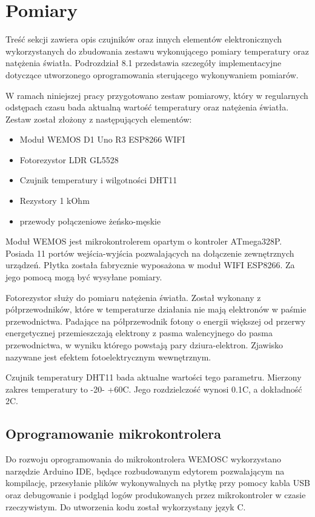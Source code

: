 \newpage
\section{Pomiary}
Treść sekcji zawiera opis czujników oraz innych elementów elektronicznych
wykorzystanych do zbudowania zestawu wykonującego pomiary temperatury
oraz natężenia światła. Podrozdział 8.1 przedstawia szczegóły implementacyjne
dotyczące utworzonego oprogramowania sterującego wykonywaniem pomiarów.

W ramach niniejszej pracy przygotowano zestaw pomiarowy, który 
w regularnych odstępach czasu bada aktualną wartość temperatury oraz
natężenia światła. Zestaw został złożony z następujących elementów:

\begin{itemize} %
    \item Moduł WEMOS D1 Uno R3 ESP8266 WIFI
    \item Fotorezystor LDR GL5528
    \item Czujnik temperatury i wilgotności DHT11
    \item Rezystory 1 kOhm
    \item przewody połączeniowe żeńsko-męskie
\end{itemize}

Moduł WEMOS jest mikrokontrolerem opartym o kontroler ATmega328P. Posiada
11 portów wejścia-wyjścia pozwalających na dołączenie zewnętrznych 
urządzeń. Płytka została fabrycznie wyposażona w moduł WIFI ESP8266. Za
jego pomocą mogą być wysyłane pomiary.

Fotorezystor służy do pomiaru natężenia światła. Został wykonany 
z półprzewodników, które w temperaturze działania nie mają elektronów 
w paśmie przewodnictwa. Padające na półprzewodnik fotony o energii 
większej od przerwy energetycznej przemieszczają elektrony z pasma 
walencyjnego do pasma przewodnictwa, w wyniku którego powstają pary 
dziura-elektron. Zjawisko nazywane jest efektem fotoelektrycznym 
wewnętrznym.

Czujnik temperatury DHT11 bada aktualne wartości tego
parametru. Mierzony zakres temperatury to -20\degree  - +60\degree C.
Jego rozdzielczość wynosi 0.1\degree C, a dokładność 2\degree C.

\subsection{Oprogramowanie mikrokontrolera}

Do rozwoju oprogramowania do mikrokontrolera WEMOSC wykorzystano narzędzie 
Arduino IDE, będące rozbudowanym edytorem pozwalającym na kompilację,
przesyłanie plików wykonywalnych na płytkę przy pomocy kabla USB oraz
debugowanie i podgląd logów produkowanych przez mikrokontroler w czasie 
rzeczywistym. Do utworzenia kodu został wykorzystany język C.


